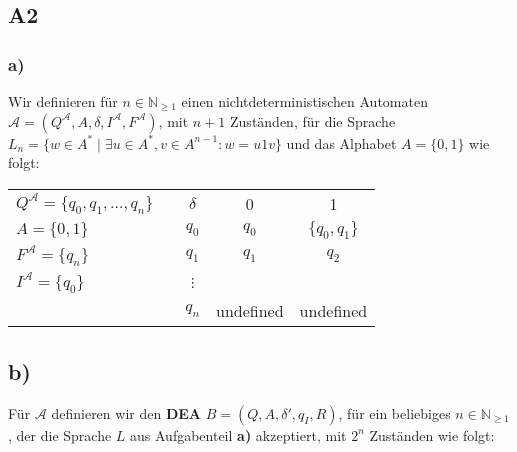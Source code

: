 \documentclass[12pt, a4paper]{article}
\newcommand*{\puffer}{\text{ }\text{ }\text{ }\text{ }}
\begin{document}
\subsection*{A2}
\subsubsection*{a)}
Wir definieren für \(n \in \mathbb{N}_{\geq 1}\) einen nichtdeterministischen Automaten
\(\mathcal{A} = (Q^{\mathcal{A}}, A, \delta, I^{\mathcal{A}}, F^{\mathcal{A}})\), mit 
\(n+1\) Zuständen, für die Sprache \(L_n = \{w \in A^* \mid \exists u \in A^*,
v \in A^{n-1} : w = u1v\}\) und das Alphabet \(A = \{0,1\}\) wie folgt:\\

\begin{center}
    \begin{tabular}{l c c | c c}
        \(Q^{\mathcal{A}}= \{q_0, q_1, \ldots, q_n\}\) & \puffer \puffer & \(\delta\) & 0         & 1\\\cmidrule{3-5}
        \(A = \{0,1\}\)                                                 &&\(q_0\)     & \(q_0\)   & \(\{q_0, q_1\}\) \\
        \(F^{\mathcal{A}}=\{q_n\}\)                                     &&\(q_1\)     & \(q_1\)   & \(q_2\) \\
        \(I^{\mathcal{A}} = \{q_0\}\)                                   &&\(\vdots\)  &           & \\
                                                                        &&\(q_n\)     & undefined & undefined \\
    \end{tabular}
\end{center}
\pagebreak
\subsection*{b)}
Für \(\mathcal{A}\) definieren wir den \textbf{DEA} \(B = (Q, A, \delta ', q_I, R)\), 
für ein beliebiges \(n \in \mathbb{N}_{\geq 1}\), der die Sprache \(L\) aus Aufgabenteil
\textbf{a)} akzeptiert, mit \(2^n\) Zuständen wie folgt:
\end{document}
